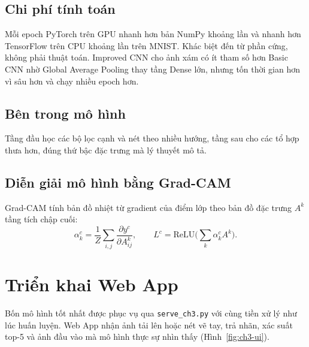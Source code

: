 \subsection{Chi phí tính toán}

Mỗi epoch PyTorch trên GPU nhanh hơn bản NumPy khoảng  lần và nhanh hơn TensorFlow trên CPU khoảng  lần trên MNIST. Khác biệt đến từ phần cứng, không phải thuật toán. Improved CNN cho ảnh xám có ít tham số hơn Basic CNN nhờ
Global Average Pooling thay tầng Dense lớn, nhưng tốn thời gian hơn vì sâu hơn và chạy nhiều epoch hơn.


\subsection{Bên trong mô hình}

Tầng đầu học các bộ lọc cạnh và nét theo nhiều hướng, tầng sau cho các tổ hợp thưa hơn, đúng thứ bậc đặc trưng mà lý thuyết mô tả.

\subsection{Diễn giải mô hình bằng Grad-CAM}
Grad-CAM \cite{ch3:selvaraju2017} tính bản đồ nhiệt từ gradient của điểm lớp theo bản đồ đặc trưng $A^k$ tầng tích chập cuối:
\begin{equation}
  \alpha_k^c=\frac1Z\sum_{i,j}\frac{\partial y^c}{\partial A^k_{ij}},\qquad L^c=\mathrm{ReLU}\Big(\sum_k\alpha_k^cA^k\Big).
\end{equation}


\section{Triển khai Web App}\label{sec:cnn-deploy}
Bốn mô hình tốt nhất được phục vụ qua \texttt{serve\_ch3.py} với cùng tiền xử lý như lúc huấn luyện. Web App nhận ảnh tải lên hoặc nét vẽ tay, trả nhãn, xác suất top-5 và ảnh đầu vào mà mô hình thực sự nhìn thấy (Hình~\ref{fig:ch3-ui}).

